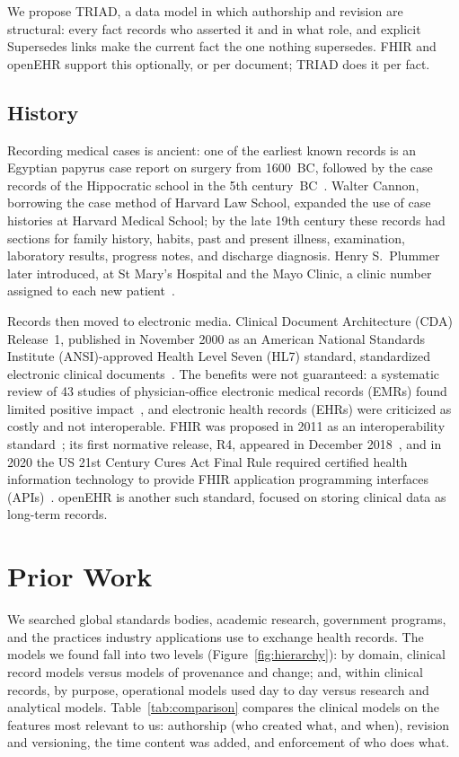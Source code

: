 \documentclass[sigconf]{acmart}
\begin{document}
We propose TRIAD, a data model in which authorship and revision are structural: every fact records who asserted it and in what role, and explicit Supersedes links make the current fact the one nothing supersedes. FHIR and openEHR support this optionally, or per document; TRIAD does it per fact.

\subsection{History}
Recording medical cases is ancient: one of the earliest known records is an
Egyptian papyrus case report on surgery from 1600~BC, followed by the case
records of the Hippocratic school in the 5th century~BC~\cite{gillum2013}.
Walter Cannon, borrowing the case method of Harvard Law School, expanded the
use of case histories at Harvard Medical School; by the late 19th century these
records had sections for family history, habits, past and present illness,
examination, laboratory results, progress notes, and discharge diagnosis.
Henry S.\ Plummer later introduced, at St Mary's Hospital and the Mayo Clinic,
a clinic number assigned to each new patient~\cite{gillum2013}.

Records then moved to electronic media. Clinical Document Architecture (CDA) Release~1, published in November
2000 as an American National Standards Institute (ANSI)-approved Health Level
Seven (HL7) standard, standardized electronic clinical
documents~\cite{dolin2001}. The benefits were not guaranteed: a systematic
review of 43 studies of physician-office electronic medical records (EMRs) found limited
positive impact~\cite{lau2012}, and electronic health records (EHRs) were criticized as costly and not
interoperable. FHIR was proposed in 2011 as an interoperability
standard~\cite{ayaz2021}; its first normative release, R4, appeared in
December 2018~\cite{hl7fhirhistory}, and in 2020 the US 21st Century Cures Act
Final Rule required certified health information technology to provide FHIR application
programming interfaces (APIs)~\cite{cures2020}.
openEHR is another such standard, focused on storing clinical data as
long-term records.

\section{Prior Work}
We searched global standards bodies, academic research, government programs,
and the practices industry applications use to exchange health records. The
models we found fall into two levels (Figure~\ref{fig:hierarchy}): by domain,
clinical record models versus models of provenance and change; and, within
clinical records, by purpose, operational models used day to day versus research and analytical models.
Table~\ref{tab:comparison} compares the clinical models on the features most
relevant to us: authorship (who created what, and when), revision and
versioning, the time content was added, and enforcement of who does what.
\end{document}
